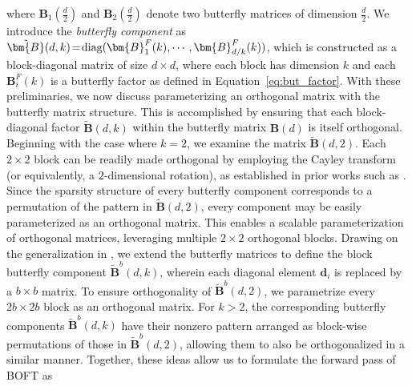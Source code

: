 where $\bm{B}_1(\frac{d}{2})$ and $\bm{B}_2(\frac{d}{2})$ denote two butterfly matrices of dimension $\frac{d}{2}$. We introduce the \emph{butterfly component} as $\thickmuskip=2mu \medmuskip=2mu \tilde{\bm{B}}(d,k)=\text{diag}(\bm{B}^F_1(k),\cdots,\bm{B}^F_{d/k}(k))$, which is constructed as a block-diagonal matrix of size $d\times d$, where each block has dimension $k$ and each $\bm{B}^F_i(k)$ is a butterfly factor as defined in Equation~\ref{eq:but_factor}. With these preliminaries, we now discuss parameterizing an orthogonal matrix with the butterfly matrix structure. This is accomplished by ensuring that each block-diagonal factor $\tilde{\bm{B}}(d,k)$ within the butterfly matrix $\bm{B}(d)$ is itself orthogonal. Beginning with the case where $k=2$, we examine the matrix $\tilde{\bm{B}}(d,2)$. Each $2 \times 2$ block can be readily made orthogonal by employing the Cayley transform (or equivalently, a $2$-dimensional rotation), as established in prior works such as \cite{liu2021orthogonal,qiu2023controlling}. Since the sparsity structure of every butterfly component corresponds to a permutation of the pattern in $\tilde{\bm{B}}(d,2)$, every component may be easily parameterized as an orthogonal matrix. This enables a scalable parameterization of orthogonal matrices, leveraging multiple $2\times 2$ orthogonal blocks. Drawing on the generalization in \cite{chen2022pixelated}, we extend the butterfly matrices to define the block butterfly component $\tilde{\bm{B}}^b(d,k)$, wherein each diagonal element $\bm{d}_i$ is replaced by a $b\times b$ matrix. To ensure orthogonality of $\tilde{\bm{B}}^b(d,2)$, we parametrize every $2b\times 2b$ block as an orthogonal matrix. For $k>2$, the corresponding butterfly components $\tilde{\bm{B}}^b(d,k)$ have their nonzero pattern arranged as block-wise permutations of those in $\tilde{\bm{B}}^b(d,2)$, allowing them to also be orthogonalized in a similar manner. Together, these ideas allow us to formulate the forward pass of BOFT as

